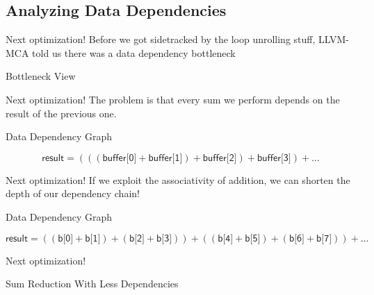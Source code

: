 
\subsection{Analyzing Data Dependencies}


\begin{frame}{Next optimization!}
Before we got sidetracked by the loop unrolling stuff, LLVM-MCA told us there was a \alert{data dependency} bottleneck
\begin{block}{Bottleneck View}
\txtinput[\tt\fontsize{5.7pt}{6pt}\selectfont]{listings/01_add_reduction_v1_p04.txt}
\end{block}
\end{frame}


\begin{frame}{Next optimization!}
The problem is that every sum we perform depends on the result of the previous one.
\bigskip
\begin{block}{Data Dependency Graph}
\begin{center}

\medskip
\[
\textsf{result} = \left(\left(\left(\textsf{buffer[0]} + \textsf{buffer[1]}\right) + \textsf{buffer[2]}\right) + \textsf{buffer[3]}\right) + \ldots
\]
\end{center}
\end{block}
\end{frame}


\begin{frame}{Next optimization!}
If we exploit the associativity of addition, we can shorten the depth of our dependency chain!
\medskip
\begin{block}{Data Dependency Graph}
\small
\begin{center}

\end{center}
\[
\textsf{result} = \left(\left(\textsf{b[0]} + \textsf{b[1]}\right) + \left(\textsf{b[2]} + \textsf{b[3]}\right)\right) + \left(\left(\textsf{b[4]} + \textsf{b[5]}\right) + \left(\textsf{b[6]} + \textsf{b[7]}\right)\right) + \ldots
\]
\end{block}
\end{frame}


\begin{frame}{Next optimization!}
\begin{block}{Sum Reduction With Less Dependencies}
\end{block}
\end{frame}


